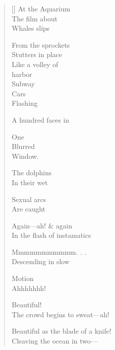 \label{ch:later}
\settowidth{\versewidth}{Beautiful as the blade of a knife!}
\begin{verse}[\versewidth]
At the Aquarium\\
The film about\\
Whales slips

From the sprockets\\
Stutters in place\\
Like a volley of\\
harbor\\
Subway\\
Cars\\
Flashing

A hundred faces in

One\\
Blurred\\
Window.

The dolphins\\
In their wet

Sexual arcs\\
Are caught

Again---ah!   \& again\\
In the flash of instamatics

Mmmmmmmmmmm. . .\\
Descending in slow

Motion\\
Ahhhhhhh!

Beautiful!\\
The crowd begins to sweat---ah!

Beautiful as the blade of a knife!\\
Cleaving the ocean in two---
\end{verse}
